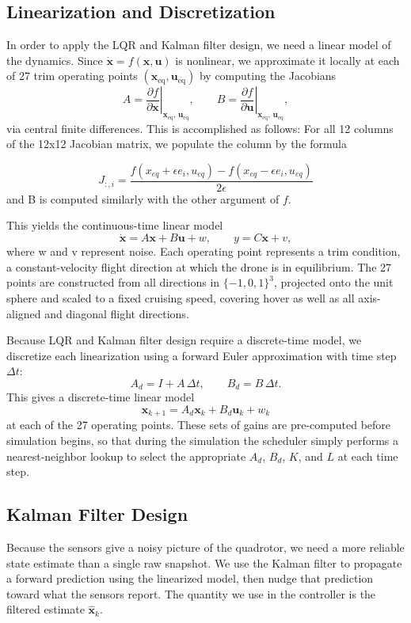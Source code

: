 \documentclass[11pt]{amsart}
\begin{document}
\subsection{Linearization and Discretization}


In order to apply the LQR and Kalman filter design, we need a linear model of the 
dynamics. Since $\dot{\mathbf{x}} = f(\mathbf{x}, \mathbf{u})$ is nonlinear, we 
approximate it locally at each of 27 trim operating points 
$(\mathbf{x}_{\text{eq}}, \mathbf{u}_{\text{eq}})$ by computing the Jacobians
\[
A = \left.\frac{\partial f}{\partial \mathbf{x}}\right|_{\mathbf{x}_{\text{eq}},\,\mathbf{u}_{\text{eq}}}, 
\qquad
B = \left.\frac{\partial f}{\partial \mathbf{u}}\right|_{\mathbf{x}_{\text{eq}},\,\mathbf{u}_{\text{eq}}},
\]
via central finite differences. This is accomplished as follows: For all 12 columns 
of the 12x12 Jacobian matrix, we populate the column by the formula 

\[
J_{:,i} = \frac{f(x_{eq} + \epsilon e_i, u_{eq}) - f(x_{eq} - \epsilon e_i, u_{eq})}{2\epsilon}
\]
and B is computed similarly with the other argument of $f$.

This yields the continuous-time linear model
\[
\dot{\mathbf{x}} = A\mathbf{x} + B\mathbf{u} + w, \qquad y = C\mathbf{x} + v,
\]
where w and v represent noise. Each operating point represents a trim condition, a constant-velocity flight direction at which 
the drone is in equilibrium. The 27 points are constructed from all directions in 
$\{-1, 0, 1\}^3$, projected onto the unit sphere and scaled to a fixed cruising 
speed, covering hover as well as all axis-aligned and diagonal flight directions.

Because LQR and Kalman filter design require a discrete-time model, we discretize 
each linearization using a forward Euler approximation with time step $\Delta t$:
\[
A_d = I + A\,\Delta t, \qquad B_d = B\,\Delta t.
\]
This gives a discrete-time linear model
\[
\mathbf{x}_{k+1} = A_d \mathbf{x}_k + B_d \mathbf{u}_k + w_k
\]
at each of the 27 operating points. These sets of gains are pre-computed
before simulation begins, so that during the simulation the scheduler simply performs a nearest-neighbor lookup to select the appropriate $A_d$, $B_d$, $K$, and $L$ at each time step.

\subsection{Kalman Filter Design}

Because the sensors give a noisy picture of the quadrotor, we need a more reliable state estimate than a single raw snapshot. We use the Kalman filter to propagate a forward prediction using the linearized model, then nudge that prediction toward what the sensors report. The quantity we use in the controller is the filtered estimate $\hat{\mathbf{x}}_k$.
\end{document}
